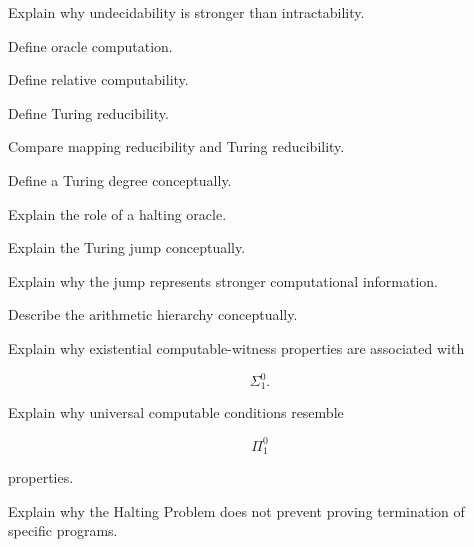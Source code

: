 \begin{exercise}[3]
Explain why undecidability is stronger than intractability.
\end{exercise}

\begin{exercise}[2]
Define oracle computation.
\end{exercise}

\begin{exercise}[3]
Define relative computability.
\end{exercise}

\begin{exercise}[3]
Define Turing reducibility.
\end{exercise}

\begin{exercise}[3]
Compare mapping reducibility and Turing reducibility.
\end{exercise}

\begin{exercise}[3]
Define a Turing degree conceptually.
\end{exercise}

\begin{exercise}[3]
Explain the role of a halting oracle.
\end{exercise}

\begin{exercise}[3]
Explain the Turing jump conceptually.
\end{exercise}

\begin{exercise}[3]
Explain why the jump represents stronger computational information.
\end{exercise}

\begin{exercise}[3]
Describe the arithmetic hierarchy conceptually.
\end{exercise}

\begin{exercise}[3]
Explain why existential computable-witness properties are associated with

\[
\Sigma^0_1.
\]
\end{exercise}

\begin{exercise}[3]
Explain why universal computable conditions resemble

\[
\Pi^0_1
\]

properties.
\end{exercise}

\begin{exercise}[3]
Explain why the Halting Problem does not prevent proving termination of
specific programs.
\end{exercise}

